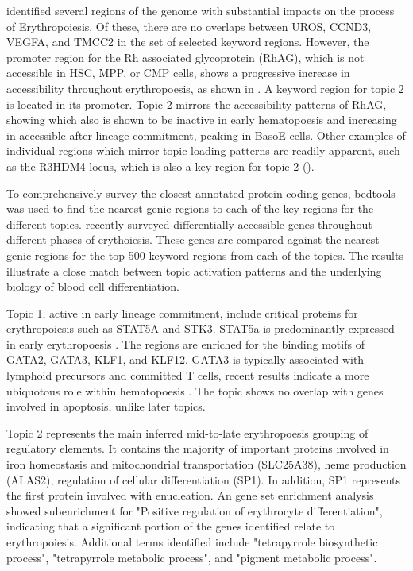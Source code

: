 \textcite{Ludwig2019} identified several regions of the genome with substantial impacts on the process of Erythropoiesis. Of these, there are no overlaps between UROS, CCND3, VEGFA, and TMCC2 in the set of selected keyword regions. However, the promoter region for the Rh associated glycoprotein (RhAG), which is not accessible in HSC, MPP, or CMP cells, shows a progressive increase in accessibility throughout erythropoesis, as shown in . A keyword region for topic 2 is located in its promoter. Topic 2 mirrors the accessibility patterns of RhAG, showing  which also is shown to be inactive in early hematopoesis and increasing in accessible after lineage commitment, peaking in BasoE cells. Other examples of individual regions which mirror topic loading patterns are readily apparent, such as the R3HDM4 locus, which is also a key region for topic 2 (). 

To comprehensively survey the closest annotated protein coding genes, bedtools was used to find the nearest genic regions to each of the key regions for the different topics. \textcite{Mello2019} recently surveyed differentially accessible genes throughout different phases of erythoiesis. These genes are compared against the nearest genic regions for the top 500 keyword regions from each of the topics. The results illustrate a close match between topic activation patterns and the underlying biology of blood cell differentiation.

Topic 1, active in early lineage commitment, include critical proteins for erythropoiesis such as STAT5A and STK3. STAT5a is predominantly expressed in early erythropoesis \cite{Pishesha2014}. The regions are enriched for the binding motifs of GATA2, GATA3, KLF1, and KLF12. GATA3 is typically associated with lymphoid precursors and committed T cells, recent results indicate a more ubiquotous role within hematopoesis \cite{Chen2001}. The topic shows no overlap with genes involved in apoptosis, unlike later topics.  

Topic 2 represents the main inferred mid-to-late erythropoesis grouping of regulatory elements. It contains the majority of important proteins involved in iron homeostasis and mitochondrial transportation (SLC25A38), heme production (ALAS2), regulation of cellular differentiation (SP1). In addition, SP1 represents the first protein involved with enucleation. An gene set enrichment analysis showed subenrichment for "Positive regulation of erythrocyte differentiation", indicating that a significant portion of the genes identified relate to erythropoiesis. Additional terms identified include "tetrapyrrole biosynthetic process", "tetrapyrrole metabolic process", and "pigment metabolic process".  

